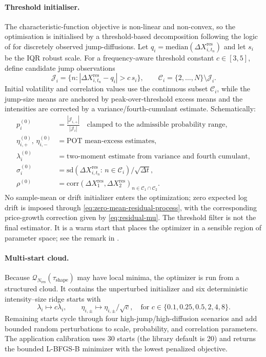 \documentclass[11pt]{article}
\begin{document}
\paragraph{Threshold initialiser.}
The characteristic-function objective is non-linear and non-convex,
so the optimisation is initialised by a threshold-based decomposition
following the logic of \citet{Mancini2009} for discretely observed
jump-diffusions.
Let $q_i=\mathrm{median}(\Delta X_{i,t_n}^{\mathrm{res}})$ and let $s_i$ be the IQR robust scale.
For a frequency-aware threshold constant $c\in[3,5]$, define candidate
jump observations
\[
\mathcal{J}_i=\{n:|\Delta X_{i,t_n}^{\mathrm{res}}-q_i|>c\,s_i\},
\qquad
\mathcal{C}_i=\{2,\ldots,N\}\setminus\mathcal{J}_i.
\]
Initial volatility and correlation values use the continuous subset
$\mathcal{C}_i$, while the jump-size means are anchored by peak-over-threshold
excess means and the intensities are corrected by a variance/fourth-cumulant
estimate.  Schematically:
\begin{align*}
p_i^{(0)}&=\frac{|\mathcal{J}_{i,+}|}{|\mathcal{J}_i|}
  \quad\text{clamped to the admissible probability range},\\
\eta_{i,+}^{(0)},\,\eta_{i,-}^{(0)}&=\text{POT mean-excess estimates},\\
\lambda_i^{(0)}&=\text{two-moment estimate from variance and fourth cumulant},\\
\sigma_i^{(0)}&=\mathrm{sd}(\Delta X_{i,t_n}^{\mathrm{res}}:\,n\in\mathcal{C}_i)/\sqrt{\Delta t},\\
\rho^{(0)}&=\mathrm{corr}(\Delta X_1^{\mathrm{res}},\Delta X_2^{\mathrm{res}})_{n\in\mathcal{C}_1\cap\mathcal{C}_2}.
\end{align*}
No sample-mean or drift initializer enters the optimization; zero expected log drift is
imposed through \eqref{eq:zero-mean-residual-process}, with the corresponding price-growth
correction given by \eqref{eq:residual-mu}. The threshold filter is not the final estimator.
It is a warm start that places the optimizer in a sensible region of
parameter space; see the remark in \citet{Mancini2009}.

\paragraph{Multi-start cloud.}
Because $\mathcal{Q}_{N_{\mathrm{res}}}(\tau_{\mathrm{shape}})$ may have local minima,
the optimizer is run from a
structured cloud. It contains the unperturbed initializer and six deterministic
intensity--size ridge starts with
\[
\lambda_i\mapsto c\lambda_i,\qquad
\eta_{i,\pm}\mapsto\eta_{i,\pm}/\sqrt{c},\quad
\text{for }c\in\{0.1,0.25,0.5,2,4,8\}.
\]
Remaining starts cycle through four high-jump/high-diffusion scenarios and add bounded
random perturbations to scale, probability, and correlation parameters. The
application calibration uses 30 starts (the library default is 20) and returns the bounded
L-BFGS-B minimizer with the lowest penalized objective.
\end{document}
